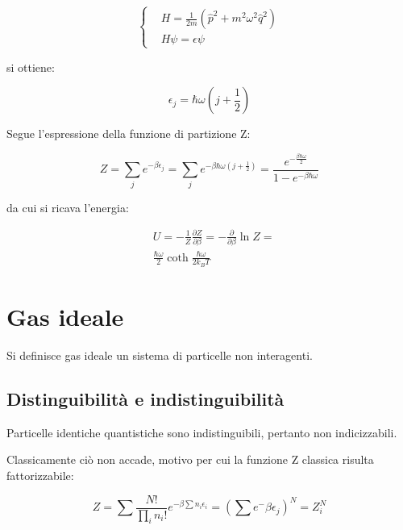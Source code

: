 \documentclass{article}
\begin{document}
\begin{equation}
    \left\{
    \begin{aligned}
         & H=\frac{1}{2m}(\hat{p}^2+m^2\omega^2\hat{q}^2) \\
         & H\psi=\epsilon\psi
    \end{aligned}
    \right.
\end{equation}

si ottiene:

\begin{equation}
    \epsilon_j=\hbar\omega(j+\frac{1}{2})
\end{equation}

Segue l'espressione della funzione di partizione Z:

\begin{equation}
    Z=\sum_{j}e^{-\beta\epsilon_j}=\sum_{j}e^{-\beta\hbar\omega(j+\frac{1}{2})}=\frac{e^{-\frac{\beta\hbar\omega}{2}}}{1-e^{-\beta\hbar\omega}}
\end{equation}

da cui si ricava l'energia:

\begin{equation}
    \begin{aligned}
         & U=-\frac{1}{Z}\frac{\partial Z}{\partial \beta}= -\frac{\partial}{\partial \beta}\ln{Z}= \\
         & \frac{\hbar \omega}{2}\coth{\frac{\hbar \omega}{2k_BT}}
    \end{aligned}
\end{equation}

\section{Gas ideale}
Si definisce gas ideale un sistema di particelle non interagenti.

\subsection{Distinguibilità e indistinguibilità}
Particelle identiche quantistiche sono indistinguibili, pertanto non indicizzabili.

Classicamente ciò non accade, motivo per cui la funzione Z classica risulta fattorizzabile:

\begin{equation}
    Z= \sum \frac{N!}{\prod_in_i!}e^{-\beta\sum n_i\epsilon_i}=\left(\sum e^-{\beta \epsilon_j}\right)^N=Z_i^N
\end{equation}
\end{document}
